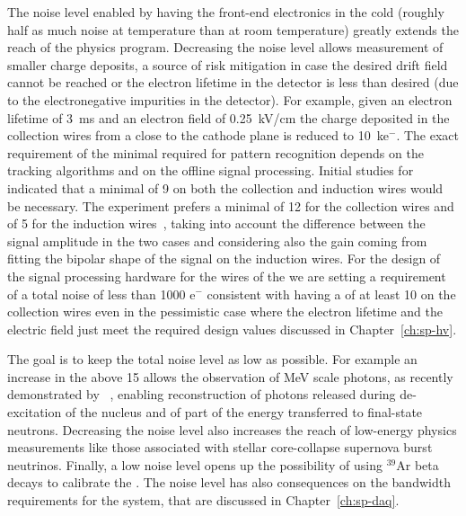 The noise level enabled by having the front-end electronics in the cold (roughly 
half as much noise at  temperature than at room temperature) greatly 
extends the reach of the  physics program. Decreasing the noise level 
allows measurement of smaller charge deposits, a source of risk mitigation in 
case the desired drift field cannot be reached or the electron lifetime in the 
detector is less than desired (due to the electronegative impurities in the 
detector). For example, given an electron lifetime of \SI{3}{ms} and an electron field
of \SI{0.25}{kV/cm} the charge deposited in the collection wires from a 
 close to the cathode plane is reduced to \SI{10}{k}{e$^-$}.
The exact requirement of the minimal  required for pattern
recognition depends on the tracking algorithms and on the offline signal processing.
Initial studies for  indicated that a minimal  of 9 
on both the collection and induction wires would be necessary. The 
 experiment prefers a minimal  of 12 for the
collection wires and of 5 for the induction wires~\cite{bib:sbnddoc1921}, taking into account
the difference between the signal amplitude in the two cases and considering
also the gain coming from fitting the bipolar shape of the signal on the
induction wires. For the design of the signal processing hardware for the
wires of the   we are setting a requirement of
a total noise of less than 1000 e$^-$ consistent with having a 
of at least 10 on the collection wires even in the pessimistic case 
where the electron lifetime and the electric field just meet the
required design values discussed in Chapter~\ref{ch:sp-hv}.

The goal is to keep the total noise level as low as possible. For example an 
increase in the  above 15 allows the observation of MeV scale photons, 
as recently demonstrated by ~\cite{Acciarri:2018myr}, enabling 
reconstruction of photons released during de-excitation of the nucleus and of part
of the energy transferred to final-state neutrons.
Decreasing the noise level also increases the reach of low-energy 
physics measurements like those associated with stellar core-collapse supernova 
burst neutrinos. Finally, a low noise level opens up the possibility of using 
$\mathrm{{}^{39}Ar}$ beta decays to calibrate the  .
The noise level has also consequences on the bandwidth requirements
for the  system, that are discussed in Chapter~\ref{ch:sp-daq}.

